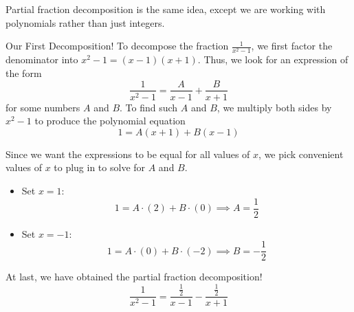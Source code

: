 Partial fraction decomposition is the same idea, except we are working with polynomials rather than just integers.

\begin{example}{Our First Decomposition!}\label{OurFirstPotatoFryDip}
 To decompose the fraction $\frac{1}{x^2-1}$, we first factor the denominator into $x^2-1=(x-1)(x+1)$.  Thus, we look for an expression of the form  $$ \frac{1}{x^2-1}=\frac{A}{x-1}+\frac{B}{x+1}$$
for some numbers $A$ and $B$.  To find such $A$ and $B$, we multiply both sides by $x^2-1$ to produce the polynomial equation  $$1=A(x+1)+B(x-1) $$

Since we want the expressions to be equal for all values of $x$, we pick convenient values of $x$ to plug in to solve for $A$ and $B$.  
\begin{itemize}
\item Set $x=1$: $$1=A\cdot (2) + B \cdot (0) \implies A=\frac{1}{2}$$
\item Set $x=-1$: $$1=A\cdot (0) + B \cdot (-2) \implies B=-\frac{1}{2}$$
\end{itemize}
At last, we have obtained the partial fraction decomposition! $$\frac{1}{x^2-1}=\frac{\frac{1}{2}}{x-1}-\frac{\frac{1}{2}}{x+1}$$
\end{example}

